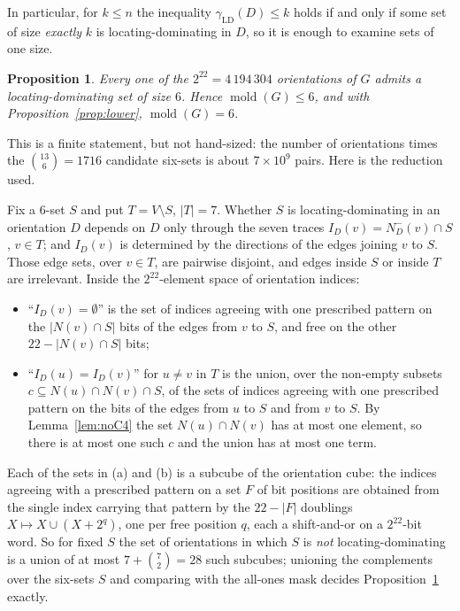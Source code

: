 \documentclass[11pt]{amsart}
\newtheorem{proposition}[theorem]{Proposition}
\theoremstyle{definition}
\theoremstyle{remark}
\DeclareMathOperator{\mold}{mold}
\newcommand{\gammaLD}{\gamma_{\mathrm{LD}}}
\newcommand{\Nin}{N^-}
\begin{document}
In particular, for $k\le n$ the inequality $\gammaLD(D)\le k$ holds if and only
if some set of size \emph{exactly} $k$ is locating-dominating in $D$, so it is
enough to examine sets of one size.

\begin{proposition}\label{prop:upper}
Every one of the $2^{22}=4\,194\,304$ orientations of $G$ admits a
locating-dominating set of size $6$. Hence $\mold(G)\le6$, and with
Proposition~\ref{prop:lower}, $\mold(G)=6$.
\end{proposition}

This is a finite statement, but not hand-sized: the number of orientations
times the $\binom{13}{6}=1716$ candidate six-sets is about $7\times10^{9}$
pairs. Here is the reduction used.

Fix a $6$-set $S$ and put $T=V\setminus S$, $|T|=7$. Whether $S$ is
locating-dominating in an orientation $D$ depends on $D$ only through the seven
traces $I_D(v)=\Nin_D(v)\cap S$, $v\in T$; and $I_D(v)$ is determined by the
directions of the edges joining $v$ to $S$. Those edge sets, over $v\in T$, are
pairwise disjoint, and edges inside $S$ or inside $T$ are irrelevant. Inside
the $2^{22}$-element space of orientation indices:
\begin{itemize}
\item[(a)] ``$I_D(v)=\emptyset$'' is the set of indices agreeing with one
  prescribed pattern on the $|N(v)\cap S|$ bits of the edges from $v$ to $S$,
  and free on the other $22-|N(v)\cap S|$ bits;
\item[(b)] ``$I_D(u)=I_D(v)$'' for $u\ne v$ in $T$ is the union, over the
  non-empty subsets $c\subseteq N(u)\cap N(v)\cap S$, of the sets of indices
  agreeing with one prescribed pattern on the bits of the edges from $u$ to $S$
  and from $v$ to $S$. By Lemma~\ref{lem:noC4} the set $N(u)\cap N(v)$ has at
  most one element, so there is at most one such $c$ and the union has at most
  one term.
\end{itemize}
Each of the sets in (a) and (b) is a subcube of the orientation cube: the
indices agreeing with a prescribed pattern on a set $F$ of bit positions are
obtained from the single index carrying that pattern by the $22-|F|$ doublings
$X\mapsto X\cup(X+2^{q})$, one per free position $q$, each a shift-and-or on a
$2^{22}$-bit word. So for fixed $S$ the set of orientations in which $S$ is
\emph{not} locating-dominating is a union of at most $7+\binom72=28$ such
subcubes; unioning the complements over the six-sets $S$ and comparing with the
all-ones mask decides Proposition~\ref{prop:upper} exactly.
\end{document}
